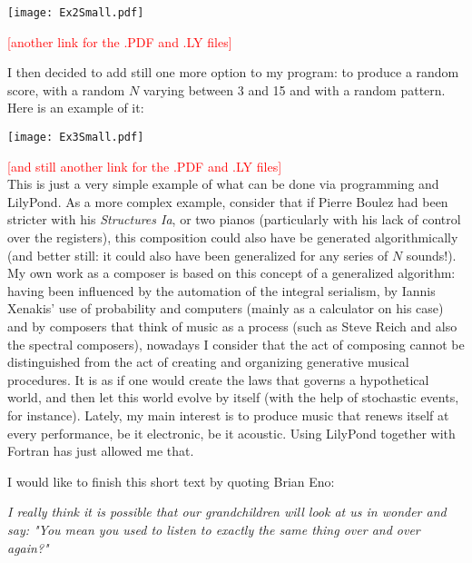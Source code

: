 \documentclass{article}
\begin{document}
\texttt{[image: Ex2Small.pdf]}

\textcolor{red}{[another link for the .PDF and .LY files]}

I then decided to add still one more option to my program: to produce a random score, with a random $N$ varying
between 3 and 15 and with a random pattern. 
Here is an example of it:

\texttt{[image: Ex3Small.pdf]}

\textcolor{red}{[and still another link for the .PDF and .LY files]} \\

This is just a very simple example of what can be done via programming and LilyPond. 
As a more complex example, consider that if Pierre Boulez had been stricter with his \textit{Structures Ia}, 
or two pianos (particularly with his lack of control over the registers), this composition could also have be
generated algorithmically (and better still: it could also have been generalized for any series of $N$ sounds!). 
My own work as a composer is based on this concept of a generalized algorithm: 
having been influenced by the automation of the integral serialism, by Iannis Xenakis' use of probability and
computers (mainly as a calculator on his case) and by composers that think of music as a process (such as Steve
Reich and also the spectral composers), nowadays I consider that the act of composing cannot be distinguished from
the act of creating and organizing generative musical procedures. 
It is as if one would create the laws that governs a hypothetical world, and then let this world evolve by
itself (with the help of stochastic events, for instance). 
Lately, my main interest is to produce music that renews itself at every performance, be it electronic,
be it acoustic. 
Using LilyPond together with Fortran has just allowed me that.

I would like to finish this short text by quoting Brian Eno:

\textit{I really think it is possible that our grandchildren will look at us in wonder and say:
"You mean you used to listen to exactly the same thing over and over again?"}
\end{document}
